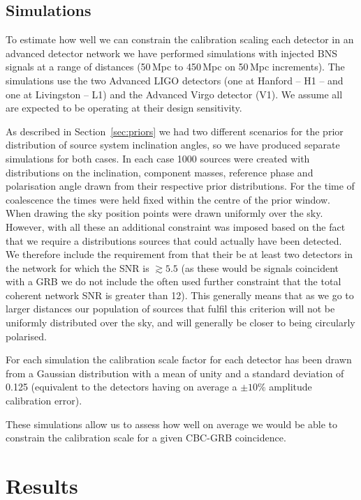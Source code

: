 \documentclass[10pt]{iopart}
\begin{document}
\subsection{Simulations}\label{sec:simulations}

To estimate how well we can constrain the calibration scaling each detector in an advanced 
detector network we have performed simulations with injected BNS signals at a range of distances 
(50\,Mpc to 450\,Mpc on 50\,Mpc increments). The simulations use the two Advanced LIGO detectors 
(one at Hanford -- H1 -- and one at Livingston -- L1) and the Advanced Virgo detector (V1). We 
assume all are expected to be operating at their design sensitivity.

As described in Section~\ref{sec:priors} we had two different scenarios for the prior distribution 
of source system inclination angles, so we have produced separate simulations for both cases. In 
each case 1000 sources were created with distributions on the inclination, component masses,
reference phase and polarisation angle drawn from their respective prior distributions. For the 
time of coalescence the times were held fixed within the centre of the prior window. When drawing 
the sky position points were drawn uniformly over the sky. However, with all these an additional 
constraint was imposed based on the fact that we require a distributions sources that could 
actually have been detected. We therefore include the requirement from \cite{2012PhRvD..85h2002A} 
that their be at least two detectors in the network for which the SNR is $\gtrsim 5.5$ (as these 
would be signals coincident with a GRB we do not include the often used further constraint that 
the total coherent network SNR is greater than 12). This generally means that as we go to larger
distances our population of sources that fulfil this criterion will not be uniformly distributed
over the sky, and will generally be closer to being circularly polarised.

For each simulation the calibration scale factor for each detector has been drawn from a Gaussian 
distribution with a mean of unity and a standard deviation of 0.125 (equivalent to the detectors 
having on average a $\pm 10\%$ amplitude calibration error).

These simulations allow us to assess how well on average we would be able to constrain the 
calibration scale for a given CBC-GRB coincidence.



\section{Results}\label{sec:results}
\end{document}
